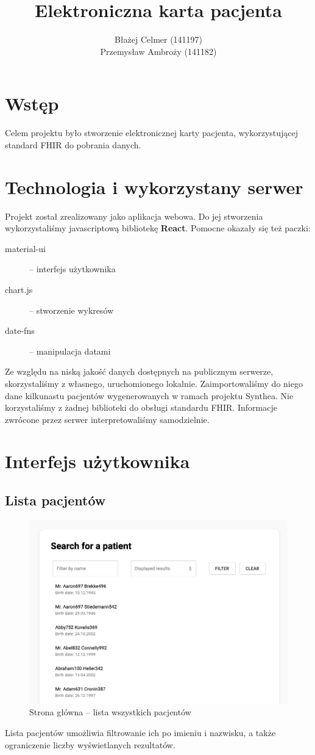 \documentclass[polish,polish,a4paper]{article}
\title{Elektroniczna karta pacjenta}
\author{Błażej Celmer (141197)\\Przemysław Ambroży (141182)}
\begin{document}
 
	\maketitle

	\newpage
	
	\section{Wstęp}
		Celem projektu było stworzenie elektronicznej karty pacjenta, wykorzystującej standard FHIR do pobrania danych.
	
	\section{Technologia i wykorzystany serwer}
		Projekt został zrealizowany jako aplikacja webowa.
		Do jej stworzenia wykorzystaliśmy javascriptową bibliotekę \textbf{React}.
		Pomocne okazały się też paczki:
		\begin{description}
			\item[material-ui] -- interfejs użytkownika
			\item[chart.js] -- stworzenie wykresów
			\item[date-fns] -- manipulacja datami
		\end{description}

		Ze względu na niską jakość danych dostępnych na publicznym serwerze,
		skorzystaliśmy z własnego, uruchomionego lokalnie.
		Zaimportowaliśmy do niego dane kilkunastu pacjentów wygenerowanych w ramach projektu Synthea.
		Nie korzystaliśmy z żadnej biblioteki do obsługi standardu FHIR.
		Informacje zwrócone przez serwer interpretowaliśmy samodzielnie.
	
	\section{Interfejs użytkownika}
	
	\subsection{Lista pacjentów}
	
	\begin{figure}[!h]
		\centering
		\includegraphics[width=.8\linewidth]{img/list1.png}
		\caption{Strona główna -- lista wszystkich pacjentów}
	\end{figure}
	Lista pacjentów umożliwia filtrowanie ich po imieniu i nazwisku,
	a także ograniczenie liczby wyświetlanych rezultatów.
	
\end{document}
